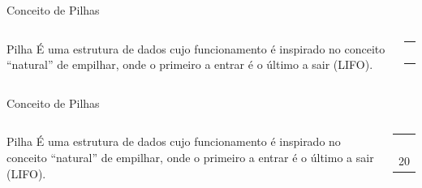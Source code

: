 \documentclass[12pt,table,xcolor={dvipsnames}]{beamer}
\begin{document}
\begin{frame}{Conceito de Pilhas}
\begin{columns}
\begin{block}{Pilha}
É uma estrutura de dados cujo funcionamento é inspirado no conceito “natural” de empilhar, onde o primeiro a entrar é o último a sair (LIFO).
\end{block}
\begin{center}
{
\begin{tabular}{ |p{.5cm}| }
\hline
 \\ \hline
 \\ \hline
 \\ \hline
 \\ \hline
 \\ \hline
  \\ \hline
\end{tabular}
}
\end{center}
\end{columns}
\end{frame}

\begin{frame}{Conceito de Pilhas}
\begin{columns}
\begin{block}{Pilha}
É uma estrutura de dados cujo funcionamento é inspirado no conceito “natural” de empilhar, onde o primeiro a entrar é o último a sair (LIFO).
\end{block}
\begin{center}
{
\begin{tabular}{ |p{.5cm}| }
\hline
 \\ \hline
 \\ \hline
 \\ \hline
 \\ \hline
 \\ \hline
20  \\ \hline
\end{tabular}
}
\end{center}
\end{columns}
\end{frame}
\end{document}
